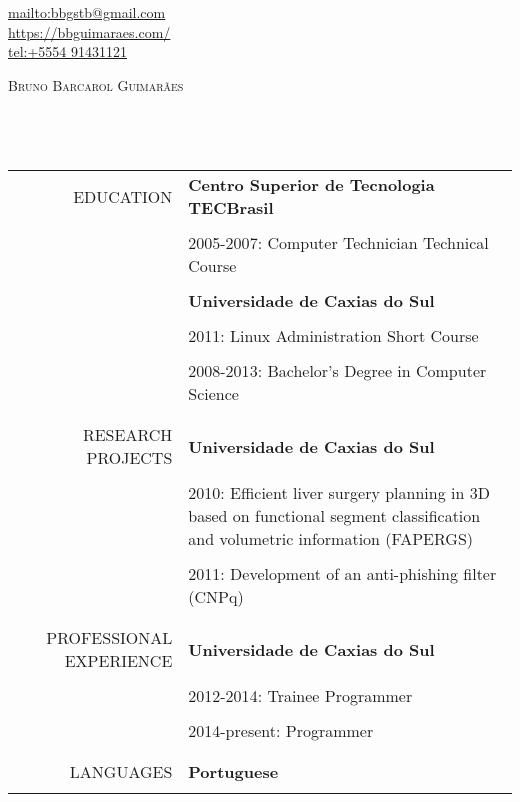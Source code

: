\begin{flushright}
    \url{mailto:bbgstb@gmail.com} \\
    \url{https://bbguimaraes.com/} \\
    \url{tel:+5554 91431121} \\
\end{flushright}
\vspace{5mm}
\textsc{\Huge Bruno Barcarol Guimarães} \\\\\\\\
\begin{tabular}{rp{12cm}}
    \uppercase{Education}
    & \textbf{Centro Superior de Tecnologia TECBrasil} \\\\
    & 2005-2007: Computer Technician Technical Course \\\\
    & \textbf{Universidade de Caxias do Sul} \\\\
    & 2011: Linux Administration Short Course \\\\
    & 2008-2013: Bachelor's Degree in Computer Science
    \\\\
    \hline
    \\
    \uppercase{Research projects}
    & \textbf{Universidade de Caxias do Sul} \\\\
    & 2010:
        Efficient liver surgery planning in 3D based on functional segment
        classification and volumetric information (FAPERGS) \\\\
    & 2011: Development of an anti-phishing filter (CNPq)
    \\\\
    \hline
    \\
    \uppercase{Professional experience}
    & \textbf{Universidade de Caxias do Sul} \\\\
    & 2012-2014: Trainee Programmer \\\\
    & 2014-present: Programmer
    \\\\
    \hline
    \\
    \uppercase{Languages}
    & \textbf{Portuguese} \\\\

\end{tabular}
